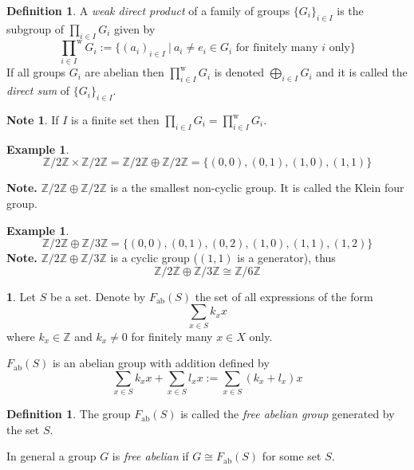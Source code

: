 \documentclass[12pt, letterpaper, oneside]{article}
\theoremstyle{plain}
\theoremstyle{definition}
\newtheorem{definition}[theorem]{Definition}
\newtheorem{example}[theorem]{Example}
\newtheorem{note}[theorem]{Note}
\newtheorem{nn}[theorem]{}
\newcommand{\Z}{{\mathbb Z}}
\newcommand{\vs}{\vskip 5mm}
\begin{document}
\vs\vs

\begin{definition} 
A \emph{weak direct product} of a family of groups $\{G_{i}\}_{i\in I}$ is the subgroup
of  $\prod_{i\in I} G_{i}$ given by 
$${\prod_{i\in I}}^{\mathrm{w}} G_{i} := \{ (a_{i})_{i\in I} \ |  \ a_{i} \neq e_{i}\in G_{i}
\text{ for finitely many $i$ only} \}$$
If all groups $G_{i}$ are abelian then ${\prod^{\mathrm{w}} _{i\in I}}G_{i}$ is denoted 
$\bigoplus_{i\in I} G_{i}$ and it is called the \emph{direct sum} of $\{G_{i}\}_{i\in I}$.
\end{definition}

\vs

\begin{note} 
If $I$ is a finite set then $\prod_{i\in I} G_{i} = {\prod^{\mathrm{w}} _{i\in I}}G_{i}$.
\end{note}

\vs\vs

\begin{example}
 $$\Z/2\Z \times \Z/2\Z = \Z/2\Z \oplus \Z/2\Z = \{(0, 0), (0, 1), (1, 0), (1, 1)\}$$

\textbf{Note.}  $ \Z/2\Z \oplus \Z/2\Z$ is a the smallest non-cyclic group. It is called the Klein four group. 
\end{example}

\vs

\begin{example}
$$\Z/2\Z \oplus \Z/3\Z = \{(0, 0), (0, 1), (0,2), (1, 0), (1, 1), (1, 2)\}$$
\textbf{Note.} $ \Z/2\Z \oplus \Z/3\Z$ is a cyclic group ($(1, 1)$ is a generator), thus 
$$\Z/2\Z \oplus \Z/3\Z \cong \Z/6\Z$$
\end{example}

\vs

\begin{nn}
Let $S$ be a set. Denote by $F_{\text{ab}}(S)$ the set of all expressions of the form 
$$\sum_{x\in S} k_{x}x$$ 
where $k_{x}\in \Z$ and $k_{x}\neq 0$ for finitely many $x\in X$ only. 

$F_{\text{ab}}(S)$ is an abelian group with addition defined by 
$$\sum_{x\in S} k_{x}x + \sum_{x\in S} l_{x}x := \sum_{x\in S} (k_{x}+l_{x})x$$ 
\end{nn}

\vs\vs 

\begin{definition}
The group $F_{\text{ab}}(S)$ is called the \emph{free abelian group} generated by the 
set $S$.

In general a group $G$ is \emph{free abelian} if $G\cong F_{\text{ab}}(S)$ for some set $S$.
\end{definition}
\end{document}

